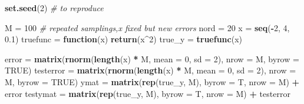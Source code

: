 \documentclass[]{article}
\newenvironment{Shaded}{\begin{snugshade}}{\end{snugshade}}
\newcommand{\CommentTok}[1]{\textcolor[rgb]{0.56,0.35,0.01}{\textit{#1}}}
\newcommand{\ControlFlowTok}[1]{\textcolor[rgb]{0.13,0.29,0.53}{\textbf{#1}}}
\newcommand{\DataTypeTok}[1]{\textcolor[rgb]{0.13,0.29,0.53}{#1}}
\newcommand{\DecValTok}[1]{\textcolor[rgb]{0.00,0.00,0.81}{#1}}
\newcommand{\FloatTok}[1]{\textcolor[rgb]{0.00,0.00,0.81}{#1}}
\newcommand{\KeywordTok}[1]{\textcolor[rgb]{0.13,0.29,0.53}{\textbf{#1}}}
\newcommand{\NormalTok}[1]{#1}
\newcommand{\OperatorTok}[1]{\textcolor[rgb]{0.81,0.36,0.00}{\textbf{#1}}}
\newcommand{\OtherTok}[1]{\textcolor[rgb]{0.56,0.35,0.01}{#1}}
\newcommand{\StringTok}[1]{\textcolor[rgb]{0.31,0.60,0.02}{#1}}
\begin{document}
\begin{Shaded}
\begin{Highlighting}[]
\KeywordTok{set.seed}\NormalTok{(}\DecValTok{2}\NormalTok{)  }\CommentTok{# to reproduce}

\NormalTok{M =}\StringTok{ }\DecValTok{100}  \CommentTok{# repeated samplings,x fixed but new errors}
\NormalTok{nord =}\StringTok{ }\DecValTok{20}
\NormalTok{x =}\StringTok{ }\KeywordTok{seq}\NormalTok{(}\OperatorTok{-}\DecValTok{2}\NormalTok{, }\DecValTok{4}\NormalTok{, }\FloatTok{0.1}\NormalTok{)}
\NormalTok{truefunc =}\StringTok{ }\ControlFlowTok{function}\NormalTok{(x) }\KeywordTok{return}\NormalTok{(x}\OperatorTok{^}\DecValTok{2}\NormalTok{)}
\NormalTok{true_y =}\StringTok{ }\KeywordTok{truefunc}\NormalTok{(x)}

\NormalTok{error =}\StringTok{ }\KeywordTok{matrix}\NormalTok{(}\KeywordTok{rnorm}\NormalTok{(}\KeywordTok{length}\NormalTok{(x) }\OperatorTok{*}\StringTok{ }\NormalTok{M, }\DataTypeTok{mean =} \DecValTok{0}\NormalTok{, }\DataTypeTok{sd =} \DecValTok{2}\NormalTok{), }\DataTypeTok{nrow =}\NormalTok{ M, }\DataTypeTok{byrow =} \OtherTok{TRUE}\NormalTok{)}
\NormalTok{testerror =}\StringTok{ }\KeywordTok{matrix}\NormalTok{(}\KeywordTok{rnorm}\NormalTok{(}\KeywordTok{length}\NormalTok{(x) }\OperatorTok{*}\StringTok{ }\NormalTok{M, }\DataTypeTok{mean =} \DecValTok{0}\NormalTok{, }\DataTypeTok{sd =} \DecValTok{2}\NormalTok{), }\DataTypeTok{nrow =}\NormalTok{ M, }
    \DataTypeTok{byrow =} \OtherTok{TRUE}\NormalTok{)}
\NormalTok{ymat =}\StringTok{ }\KeywordTok{matrix}\NormalTok{(}\KeywordTok{rep}\NormalTok{(true_y, M), }\DataTypeTok{byrow =}\NormalTok{ T, }\DataTypeTok{nrow =}\NormalTok{ M) }\OperatorTok{+}\StringTok{ }\NormalTok{error}
\NormalTok{testymat =}\StringTok{ }\KeywordTok{matrix}\NormalTok{(}\KeywordTok{rep}\NormalTok{(true_y, M), }\DataTypeTok{byrow =}\NormalTok{ T, }\DataTypeTok{nrow =}\NormalTok{ M) }\OperatorTok{+}\StringTok{ }\NormalTok{testerror}


\end{Highlighting}
\end{Shaded}
\end{document}
